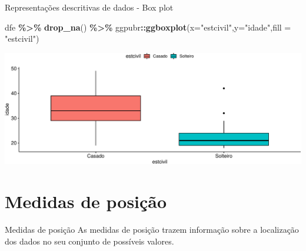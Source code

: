 \documentclass[
  9pt,
  ignorenonframetext,
  aspectratio=169]{beamer}
\newenvironment{Shaded}{\begin{snugshade}}{\end{snugshade}}
\newcommand{\DataTypeTok}[1]{\textcolor[rgb]{0.13,0.29,0.53}{#1}}
\newcommand{\KeywordTok}[1]{\textcolor[rgb]{0.13,0.29,0.53}{\textbf{#1}}}
\newcommand{\NormalTok}[1]{#1}
\newcommand{\OperatorTok}[1]{\textcolor[rgb]{0.81,0.36,0.00}{\textbf{#1}}}
\newcommand{\StringTok}[1]{\textcolor[rgb]{0.31,0.60,0.02}{#1}}
\begin{document}
\begin{frame}[fragile]{Representações descritivas de dados - Box plot}
\protect\hypertarget{representauxe7uxf5es-descritivas-de-dados---box-plot}{}
\begin{Shaded}
\begin{Highlighting}[]
\NormalTok{dfe }\OperatorTok{\%\textgreater{}\%}
\StringTok{  }\KeywordTok{drop\_na}\NormalTok{() }\OperatorTok{\%\textgreater{}\%}
\StringTok{  }\NormalTok{ggpubr}\OperatorTok{::}\KeywordTok{ggboxplot}\NormalTok{(}\DataTypeTok{x=}\StringTok{"estcivil"}\NormalTok{,}\DataTypeTok{y=}\StringTok{"idade"}\NormalTok{,}\DataTypeTok{fill =} \StringTok{"estcivil"}\NormalTok{)}
\end{Highlighting}
\end{Shaded}

\includegraphics{aula_08_files/figure-beamer/unnamed-chunk-8-1.pdf}
\end{frame}

\hypertarget{medidas-de-posiuxe7uxe3o}{%
\section{Medidas de posição}\label{medidas-de-posiuxe7uxe3o}}

\begin{frame}{Medidas de posição}
\protect\hypertarget{medidas-de-posiuxe7uxe3o-1}{}
As medidas de posição trazem informação sobre a localização dos dados no
seu conjunto de possíveis valores.
\end{frame}
\end{document}
